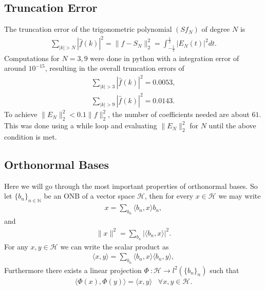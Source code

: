\documentclass[a4paper]{article}
\begin{document}
\subsection{Truncation Error}
The truncation error of the trigonometric polynomial $(Sf_N)$ of degree $N$ is
\begin{align}
    \sum_{|k| > N} |\hat{f}(k)|^2 = \lVert f - S_N\rVert_2^2 =
    \int_{-\frac{1}{2}}^{\frac{1}{2}} |E_N(t)|^2 dt.
\end{align}
Computations for $N = 3, 9$ were done in python with a integration error of
around $10^{-15}$, resulting in the overall truncation errors of
\begin{align}
    \sum_{|k| > 3} |\hat{f}(k)|^2 = 0.0053,\\
    \sum_{|k| > 9} |\hat{f}(k)|^2 = 0.0143.
\end{align}
To achieve $\lVert E_N\rVert^2_2 < 0.1 \lVert f \rVert^2_2$, the number of
coefficients needed are about $61$. This was done using a while loop and
evaluating $\lVert E_N\rVert^2_2$ for $N$ until the above condition is met.

\subsection{Orthonormal Bases}
Here we will go through the most important properties of orthonormal bases.
So let $\{b_n\}_{n\in \mathbb{N}}$ be an ONB of a vector space $\mathcal{H}$,
then for every $x\in \mathcal{H}$ we may write
\begin{align}
    x = \sum_{b_n} \langle b_n, x\rangle b_n,
\end{align}
and
\begin{align}
    \lVert x \rVert^2 = \sum_{b_n} |\langle b_n, x\rangle|^2.
\end{align}
For any $x, y \in \mathcal{H}$ we can write the scalar product as
\begin{align}
    \langle x, y\rangle = \sum_{b_n} \langle b_n, x\rangle \langle b_n,
    y\rangle,
\end{align}
Furthermore there exists a linear projection $\Phi\ : \mathcal{H}
\rightarrow l^2(\{b_n\}_n)$ such that
\begin{align}
    \langle \Phi(x), \Phi(y)\rangle = \langle x, y \rangle\;\;\; \forall x, y
    \in \mathcal{H}.
\end{align}
\end{document}
